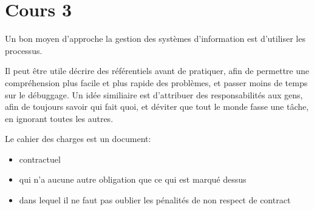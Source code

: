 \section{Cours 3}
Un bon moyen d'approche la gestion des syst\`emes d'information est d'utiliser les processus.

Il peut \^etre utile d\'ecrire des r\'ef\'erentiels avant de pratiquer, afin de permettre une compr\'ehension plus
facile et plus rapide des probl\`emes, et passer moins de temps sur le d\'ebuggage. Un id\'ee similiaire est
d'attribuer des responsabilit\'es aux gens, afin de toujours savoir qui fait quoi, et d\'eviter que tout le monde
fasse une t\^ache, en ignorant toutes les autres.

Le cahier des charges est un document:
\begin{itemize}
  \item contractuel
  \item qui n'a aucune autre obligation que ce qui est marqu\'e dessus
  \item dans lequel il ne faut pas oublier les p\'enalit\'es de non respect de contract
\end{itemize}
